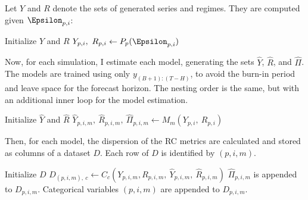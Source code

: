 \documentclass[
  letterpaper,
  DIV=11,
  numbers=noendperiod]{scrartcl}
\numberwithin{equation}{section}
\numberwithin{table}{section}
\numberwithin{figure}{section}
\begin{document}
Let \(Y\) and \(R\) denote the sets of generated series and regimes.
They are computed given \(\Epsilon_{p, i}\):

\begin{algorithm}[H]
\begin{algorithmic}[1]
    \State Initialize $Y$ and $R$
            \State $Y_{p, i},~ R_{p, i} \gets P_p(\Epsilon_{p, i})$
    \EndFor
\EndFor
\end{algorithmic}
\end{algorithm}
\vspace{-0.5em}

Now, for each simulation, I estimate each model, generating the sets
\(\hat{Y}\), \(\hat{R}\), and \(\hat{\Pi}\). The models are trained
using only \(y_{(B+1):(T-H)}\), to avoid the burn-in period and leave
space for the forecast horizon. The nesting order is the same, but with
an additional inner loop for the model estimation.

\begin{algorithm}[H]
\begin{algorithmic}[1]
    \State Initialize $\hat{Y}$ and $\hat{R}$
                \State $\hat{Y}_{p, i, m},~ \hat{R}_{p, i, m},~ \hat{\Pi}_{p, i, m} \gets M_m(Y_{p, i},~ R_{p, i})$
            \EndFor
        \EndFor
    \EndFor
\end{algorithmic}
\end{algorithm}
\vspace{-0.5em}

Then, for each model, the dispersion of the RC metrics are calculated
and stored as columns of a dataset \(D\). Each row of \(D\) is
identified by \((p, i, m)\).

\begin{algorithm}[H]
\begin{algorithmic}[1]
    \State Initialize $D$
            \State $D_{(p, i, m),~ c} \gets C_c(Y_{p, i, m}, R_{p, i, m},~ \hat{Y}_{p, i, m},~ \hat{R}_{p, i, m})$
        \EndFor
        \State $\hat{\Pi}_{p, i, m}$ is appended to $D_{p, i, m}$.
        \State Categorical variables $(p, i, m)$ are appended to $D_{p, i, m}$.
    \EndFor
\end{algorithmic}
\end{algorithm}
\vspace{-0.5em}
\end{document}
